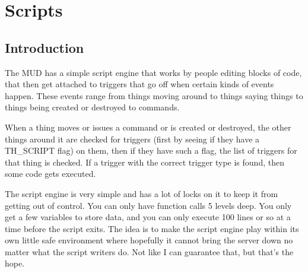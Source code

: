 \chapter{Scripts}


\section{Introduction}

The MUD has a simple script engine that works by people editing blocks
of code, that then get attached to triggers that go off when certain
kinds of events happen. These events range from things moving around
to things saying things to things being created or destroyed to commands.

When a thing moves or issues a command or is created or destroyed, the
other things around it are checked for triggers (first by seeing if
they have a TH\_SCRIPT flag) on them, then if they have such a flag,
the list of triggers for that thing is checked. If a trigger with the
correct trigger type is found, then some code gets executed.

The script engine is very simple and has a lot of locks on it to keep
it from getting out of control. You can only have function calls 5
levels deep. You only get a few variables to store data, and you can
only execute 100 lines or so at a time before the script exits. The
idea is to make the script engine play within its own little safe
environment where hopefully it cannot bring the server down no matter
what the script writers do. Not like I can guarantee that, but that's
the hope.


